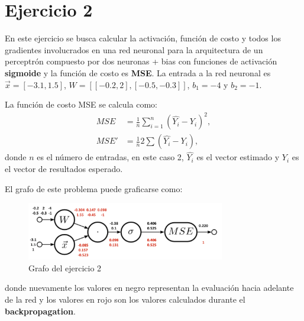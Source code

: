 \section{Ejercicio 2}

En este ejercicio se busca calcular la activación, función de costo y todos los gradientes involucrados en una red neuronal para la arquitectura de un perceptrón compuesto por dos neuronas + bias con funciones de activación \textbf{sigmoide} y la función de costo es \textbf{MSE}.
La entrada a la red neuronal es $\vec{x}=[-3.1, 1.5]$, $W=[[-0.2, 2],[-0.5, -0.3]]$, $b_1=-4$ y $b_2=-1$.

La función de costo MSE se calcula como:
\begin{align}
    MSE&=\frac{1}{n}\sum^n_{i=1}(\hat{Y_i}-Y_i)^2,\\
    MSE'&=\frac{1}{n} 2 \sum (\hat{Y_i}-Y_i),
\end{align}
donde $n$ es el número de entradas, en este caso 2, $\hat{Y_i}$ es el vector estimado y $Y_i$ es el vector de resultados esperado.

El grafo de este problema puede graficarse como:

\begin{figure}[H]
    \centering
    \includegraphics[height=1in]{image/ej2.png}
    \caption{Grafo del ejercicio 2}
    \label{fig:my_label}
\end{figure}
donde nuevamente los valores en negro representan la evaluación hacia adelante de la red y los valores en rojo son los valores calculados durante el \textbf{backpropagation}.


